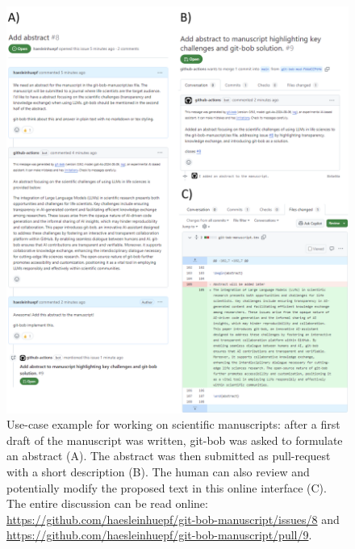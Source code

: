 \documentclass[times, twoside]{zHenriquesLab-StyleBioRxiv}
\begin{document}
\begin{figure}[h]
\centering
\includegraphics[width=\textwidth]{example_abstract_generation.png}
\caption{Use-case example for working on scientific manuscripts: after a first draft of the manuscript was written, git-bob was asked to formulate an abstract (A). The abstract was then submitted as pull-request with a short description (B). The human can also review and potentially modify the proposed text in this online interface (C). The entire discussion can be read online: \url{https://github.com/haesleinhuepf/git-bob-manuscript/issues/8} and \url{https://github.com/haesleinhuepf/git-bob-manuscript/pull/9}.
\newline
\newline
}
\label{fig:xample_abstract_generation}
\end{figure}


\end{document}
